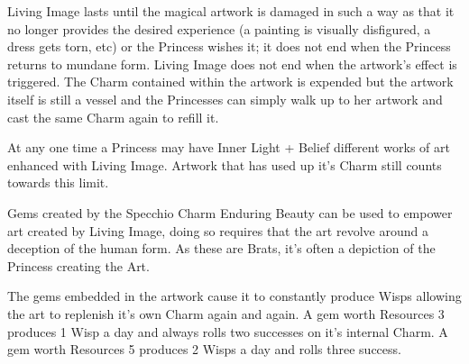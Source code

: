 Living Image lasts until the magical artwork is damaged in such a way as that it no longer provides the desired experience (a painting is visually disfigured, a dress gets torn, etc) or the Princess wishes it; it does not end when the Princess returns to mundane form. Living Image does not end when the artwork's effect is triggered. The Charm contained within the artwork is expended but the artwork itself is still a vessel and the Princesses can simply walk up to her artwork and cast the same Charm again to refill it.

At any one time a Princess may have Inner Light + Belief different works of art enhanced with Living Image. Artwork that has used up it's Charm still counts towards this limit. 

Gems created by the Specchio Charm Enduring Beauty can be used to empower art created by Living Image, doing so requires that the art revolve around a deception of the human form. As these are Brats, it's often a depiction of the Princess creating the Art. 

The gems embedded in the artwork cause it to constantly produce Wisps allowing the art to replenish it's own Charm again and again. A gem worth Resources 3 produces 1 Wisp a day and always rolls two successes on it's internal Charm. A gem worth Resources 5 produces 2 Wisps a day and rolls three success. 


